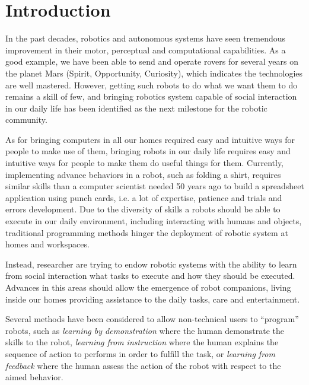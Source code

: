 
\chapter{Introduction}
\label{chapter:introduction}
\minitoc


In the past decades, robotics and autonomous systems have seen tremendous improvement in their motor, perceptual and computational capabilities. As a good example, we have been able to send and operate rovers for several years on the planet Mars (Spirit, Opportunity, Curiosity), which indicates the technologies are well mastered. However, getting such robots to do what we want them to do remains a skill of few, and bringing robotics system capable of social interaction in our daily life has been identified as the next milestone for the robotic community.

As for bringing computers in all our homes required easy and intuitive ways for people to make use of them, bringing robots in our daily life requires easy and intuitive ways for people to make them do useful things for them. Currently, implementing advance behaviors in a robot, such as folding a shirt, requires similar skills than a computer scientist needed 50 years ago to build a spreadsheet application using punch cards, i.e. a lot of expertise, patience and trials and errors development. Due to the diversity of skills a robots should be able to execute in our daily environment, including interacting with humans and objects, traditional programming methods hinger the deployment of robotic system at homes and workspaces.

Instead, researcher are trying to endow robotic systems with the ability to learn from social interaction what tasks to execute and how they should be executed. Advances in this areas should allow the emergence of robot companions, living inside our homes providing assistance to the daily tasks, care and entertainment. 

Several methods have been considered to allow non-technical users to ``program'' robots, such as \emph{learning by demonstration} where the human demonstrate the skills to the robot, \emph{learning from instruction} where the human explains the sequence of action to performs in order to fulfill the task, or \emph{learning from feedback} where the human assess the action of the robot with respect to the aimed behavior. 


